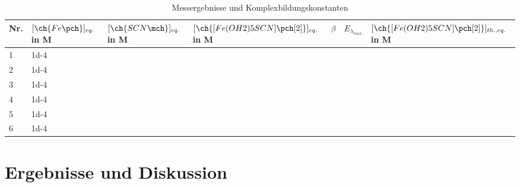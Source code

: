 \documentclass{article}
\begin{document}
      \begin{table}[H]
        \centering
        \caption[Messergebnisse und Komplexbildungskonstanten, Quelle: Autor]{Messergebnisse und Komplexbildungskonstanten}
        \label{tab:Messdatenzwei}
          \begin{tabular}{@{}llll|l|ll@{}}
            \toprule
             Nr. & $[\ch{Fe\pch}]_{eq.}$ in M & $[\ch{SCN\mch}]_{eq.}$ in M & $[\ch{[Fe(OH2)5SCN]\pch[2]}]_{eq.}$ in M & $\beta$ & $E_{\lambda_{max}}$ & $[\ch{[Fe(OH2)5SCN]\pch[2]}]_{th., eq.}$ in M \\ \midrule
             1 & \num{1d-4} &  &  &  &  & \\
             2 & \num{1d-4} &  &  &  &  & \\
             3 & \num{1d-4} &  &  &  &  & \\
             4 & \num{1d-4} &  &  &  &  & \\
             5 & \num{1d-4} &  &  &  &  & \\
             6 & \num{1d-4} &  &  &  &  & \\ \bottomrule
          \end{tabular}
       \end{table}      
      
  \section{Ergebnisse und Diskussion}
  
  \pagebreak
  
  \listofreactions
  \printbibliography[title=Literaturverzeichnis]
  \listoffigures
  \listoftables
  
\end{document}
